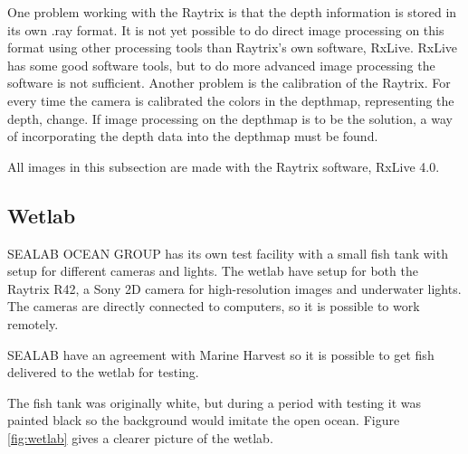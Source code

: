 One problem working with the Raytrix is that the depth information is stored in its own .ray format. It is not yet possible to do direct image processing on this format using other processing tools than Raytrix's own software, RxLive. RxLive has some good software tools, but to do more advanced image processing the software is not sufficient.
Another problem is the calibration of the Raytrix. For every time the camera is calibrated the colors in the depthmap, representing the depth, change. If image processing on the depthmap is to be the solution, a way of incorporating the depth data into the depthmap must be found.

All images in this subsection are made with the Raytrix software, RxLive 4.0.




\subsection{Wetlab}\label{wetlab}

SEALAB OCEAN GROUP has its own test facility with a small fish tank with setup for different cameras and lights. The wetlab have setup for both the Raytrix R42, a Sony 2D camera for high-resolution images and underwater lights. The cameras are directly connected to computers, so it is possible to work remotely.

SEALAB have an agreement with Marine Harvest so it is possible to get fish delivered to the wetlab for testing.

The fish tank was originally white, but during a period with testing it was painted black so the background would imitate the open ocean. Figure \ref{fig:wetlab} gives a clearer picture of the wetlab.

